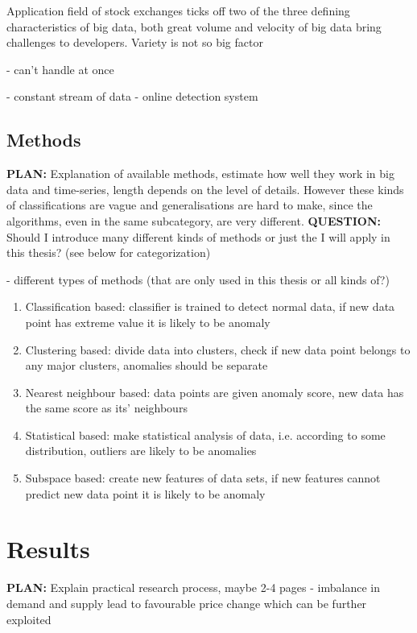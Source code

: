 \documentclass{tut-thesis}
\begin{document}
Application field of stock exchanges ticks off two of the three defining characteristics of big data, both great volume and velocity of big data bring challenges to developers. Variety is not so big factor

- can't handle at once

- constant stream of data
- online detection system


\section{Methods}
\textbf{PLAN:} Explanation of available methods, estimate how well they work in big data and time-series, length depends on the level of details. However these kinds of classifications are vague and generalisations are hard to make, since the algorithms, even in the same subcategory, are very different. 
\textbf{QUESTION:} Should I introduce many different kinds of methods or just the I will apply in this thesis? (see below for categorization)

- different types of methods (that are only used in this thesis or all kinds of?)
\begin{enumerate}
	\item Classification based: classifier is trained to detect normal data, if new data point has extreme value it is likely to be anomaly
	\item Clustering based: divide data into clusters, check if new data point belongs to any major clusters, anomalies should be separate 
	\item Nearest neighbour based: data points are given anomaly score, new data has the same score as its' neighbours
	\item Statistical based: make statistical analysis of data, i.e. according to some distribution, outliers are likely to be anomalies
	\item Subspace based: create new features of data sets, if new features cannot predict new data point it is likely to be anomaly
\end{enumerate}

\chapter{Results}
\textbf{PLAN:} Explain practical research process, maybe 2-4 pages
- imbalance in demand and supply lead to favourable price change which can be further exploited
\end{document}
